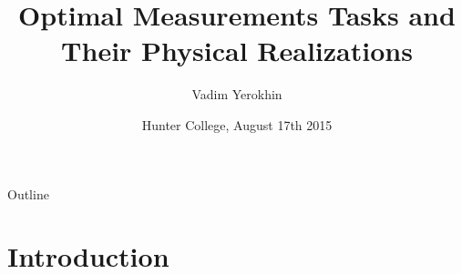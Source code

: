 \documentclass{beamer}
\title
{Optimal Measurements Tasks and Their Physical Realizations}
\author[Vadim Yerokhin] %
{Vadim Yerokhin }
\date[CFP 2003] %
{Hunter College, August 17th 2015 }
\begin{document}
\begin{frame}
  \titlepage
\end{frame}

\begin{frame}{Outline}
  \tableofcontents[pausesections]
\end{frame}





\section{Introduction}
\end{document}
